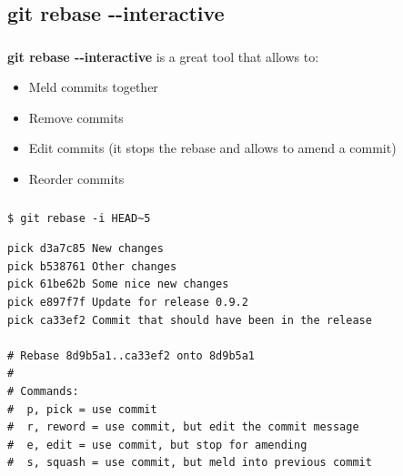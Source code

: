
\subsection{git rebase -{}-interactive}

\begin{frame}
  \begin{center}
    \textbf{\Huge{\insertsubsection}}
  \end{center}
\end{frame}


\begin{frame}
  \frametitle{\insertsubsection}

  \textbf{git rebase -{}-interactive} is a great tool that allows to:

  \begin{itemize}
    \item Meld commits together
    \item Remove commits
    \item Edit commits (it stops the rebase and allows to amend a commit)
    \item Reorder commits
  \end{itemize}

\end{frame}


\begin{frame}[fragile]
  \frametitle{\insertsubsection}

\begin{verbatim}
$ git rebase -i HEAD~5
\end{verbatim}

  \begin{footnotesize}
\begin{verbatim}
pick d3a7c85 New changes
pick b538761 Other changes
pick 61be62b Some nice new changes
pick e897f7f Update for release 0.9.2
pick ca33ef2 Commit that should have been in the release

# Rebase 8d9b5a1..ca33ef2 onto 8d9b5a1
#
# Commands:
#  p, pick = use commit
#  r, reword = use commit, but edit the commit message
#  e, edit = use commit, but stop for amending
#  s, squash = use commit, but meld into previous commit
\end{verbatim}
  \end{footnotesize}

\end{frame}

